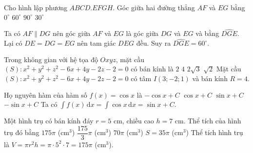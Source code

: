 \begin{ex}%
\immini
{
Cho hình lập phương $ABCD.EFGH$. Góc giữa hai đường thẳng $AF$ và $EG$ bằng
\choice
{$0^\circ$}
{\True $60^\circ$}
{$90^\circ$}
{$30^\circ$}
}
{
}
\loigiai
{
Ta có $AF\parallel DG$ nên góc giữa $AF$ và $EG$ là góc giữa $DG$ và $EG$ và bằng $\widehat{DGE}$.\\
Lại có $DE=DG=EG$ nên tam giác $DEG$ đều. Suy ra $\widehat{DGE}=60^{\circ}$.
}
\end{ex}
\begin{ex}%
Trong không gian với hệ tọa độ $O x y z$, mặt cầu $(S)\colon  x^2+y^2+z^2-6x+4y-2z-2=0$ có bán kính là
\choice
{$2$}
{\True $4$}
{$2\sqrt{3}$}
{$\sqrt{2}$}
\loigiai
{
Mặt cầu $(S)\colon x^2+y^2+z^2-6x+4y-2z-2=0$ có tâm $I(3;-2;1)$ và bán kính $R=4$.
}
\end{ex}

\begin{ex}%
Họ nguyên hàm của hàm số $f(x)=\cos x$ là
\choice
{$-\cos x+C$}
{$\cos x+C$}
{\True $\sin x+C$}
{$-\sin x+C$}
\loigiai
{
Ta có $\displaystyle\int f(x)\mathrm{\, d}x=\displaystyle\int \cos x\mathrm{\, d}x=\sin x+C$.
}
\end{ex}

\begin{ex}%
Một hình trụ có bán kính đáy $r=5$ cm, chiều cao $h=7$ cm. Thể tích của hình trụ đó bằng
\choice
{\True $175\pi$ (cm$^3$)}
{$\dfrac{175}{3}\pi$ (cm$^3$)}
{$70\pi$ (cm$^3$)}
{$S=35\pi$ (cm$^3$)}
\loigiai
{
Thể tích hình trụ là $V=\pi r^2h=\pi\cdot 5^2\cdot 7=175\pi$ (cm$^3$).
}
\end{ex}

